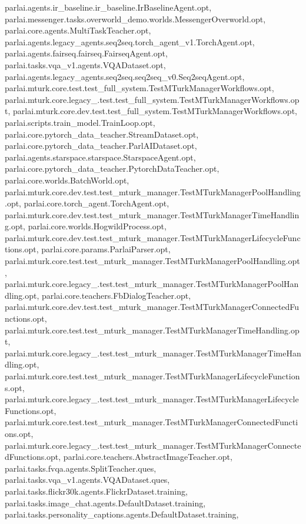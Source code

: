 parlai.\+agents.\+ir\+\_\+baseline.\+ir\+\_\+baseline.\+Ir\+Baseline\+Agent.\+opt, parlai.\+messenger.\+tasks.\+overworld\+\_\+demo.\+worlds.\+Messenger\+Overworld.\+opt, parlai.\+core.\+agents.\+Multi\+Task\+Teacher.\+opt, parlai.\+agents.\+legacy\+\_\+agents.\+seq2seq.\+torch\+\_\+agent\+\_\+v1.\+Torch\+Agent.\+opt, parlai.\+agents.\+fairseq.\+fairseq.\+Fairseq\+Agent.\+opt, parlai.\+tasks.\+vqa\+\_\+v1.\+agents.\+V\+Q\+A\+Dataset.\+opt, parlai.\+agents.\+legacy\+\_\+agents.\+seq2seq.\+seq2seq\+\_\+v0.\+Seq2seq\+Agent.\+opt, parlai.\+mturk.\+core.\+test.\+test\+\_\+full\+\_\+system.\+Test\+M\+Turk\+Manager\+Workflows.\+opt, parlai.\+mturk.\+core.\+legacy\+\_.\+test.\+test\+\_\+full\+\_\+system.\+Test\+M\+Turk\+Manager\+Workflows.\+opt, parlai.\+mturk.\+core.\+dev.\+test.\+test\+\_\+full\+\_\+system.\+Test\+M\+Turk\+Manager\+Workflows.\+opt, parlai.\+scripts.\+train\+\_\+model.\+Train\+Loop.\+opt, parlai.\+core.\+pytorch\+\_\+data\+\_\+teacher.\+Stream\+Dataset.\+opt, parlai.\+core.\+pytorch\+\_\+data\+\_\+teacher.\+Parl\+A\+I\+Dataset.\+opt, parlai.\+agents.\+starspace.\+starspace.\+Starspace\+Agent.\+opt, parlai.\+core.\+pytorch\+\_\+data\+\_\+teacher.\+Pytorch\+Data\+Teacher.\+opt, parlai.\+core.\+worlds.\+Batch\+World.\+opt, parlai.\+mturk.\+core.\+dev.\+test.\+test\+\_\+mturk\+\_\+manager.\+Test\+M\+Turk\+Manager\+Pool\+Handling.\+opt, parlai.\+core.\+torch\+\_\+agent.\+Torch\+Agent.\+opt, parlai.\+mturk.\+core.\+dev.\+test.\+test\+\_\+mturk\+\_\+manager.\+Test\+M\+Turk\+Manager\+Time\+Handling.\+opt, parlai.\+core.\+worlds.\+Hogwild\+Process.\+opt, parlai.\+mturk.\+core.\+dev.\+test.\+test\+\_\+mturk\+\_\+manager.\+Test\+M\+Turk\+Manager\+Lifecycle\+Functions.\+opt, parlai.\+core.\+params.\+Parlai\+Parser.\+opt, parlai.\+mturk.\+core.\+test.\+test\+\_\+mturk\+\_\+manager.\+Test\+M\+Turk\+Manager\+Pool\+Handling.\+opt, parlai.\+mturk.\+core.\+legacy\+\_.\+test.\+test\+\_\+mturk\+\_\+manager.\+Test\+M\+Turk\+Manager\+Pool\+Handling.\+opt, parlai.\+core.\+teachers.\+Fb\+Dialog\+Teacher.\+opt, parlai.\+mturk.\+core.\+dev.\+test.\+test\+\_\+mturk\+\_\+manager.\+Test\+M\+Turk\+Manager\+Connected\+Functions.\+opt, parlai.\+mturk.\+core.\+test.\+test\+\_\+mturk\+\_\+manager.\+Test\+M\+Turk\+Manager\+Time\+Handling.\+opt, parlai.\+mturk.\+core.\+legacy\+\_.\+test.\+test\+\_\+mturk\+\_\+manager.\+Test\+M\+Turk\+Manager\+Time\+Handling.\+opt, parlai.\+mturk.\+core.\+test.\+test\+\_\+mturk\+\_\+manager.\+Test\+M\+Turk\+Manager\+Lifecycle\+Functions.\+opt, parlai.\+mturk.\+core.\+legacy\+\_.\+test.\+test\+\_\+mturk\+\_\+manager.\+Test\+M\+Turk\+Manager\+Lifecycle\+Functions.\+opt, parlai.\+mturk.\+core.\+test.\+test\+\_\+mturk\+\_\+manager.\+Test\+M\+Turk\+Manager\+Connected\+Functions.\+opt, parlai.\+mturk.\+core.\+legacy\+\_.\+test.\+test\+\_\+mturk\+\_\+manager.\+Test\+M\+Turk\+Manager\+Connected\+Functions.\+opt, parlai.\+core.\+teachers.\+Abstract\+Image\+Teacher.\+opt, parlai.\+tasks.\+fvqa.\+agents.\+Split\+Teacher.\+ques, parlai.\+tasks.\+vqa\+\_\+v1.\+agents.\+V\+Q\+A\+Dataset.\+ques, parlai.\+tasks.\+flickr30k.\+agents.\+Flickr\+Dataset.\+training, parlai.\+tasks.\+image\+\_\+chat.\+agents.\+Default\+Dataset.\+training, parlai.\+tasks.\+personality\+\_\+captions.\+agents.\+Default\+Dataset.\+training, 